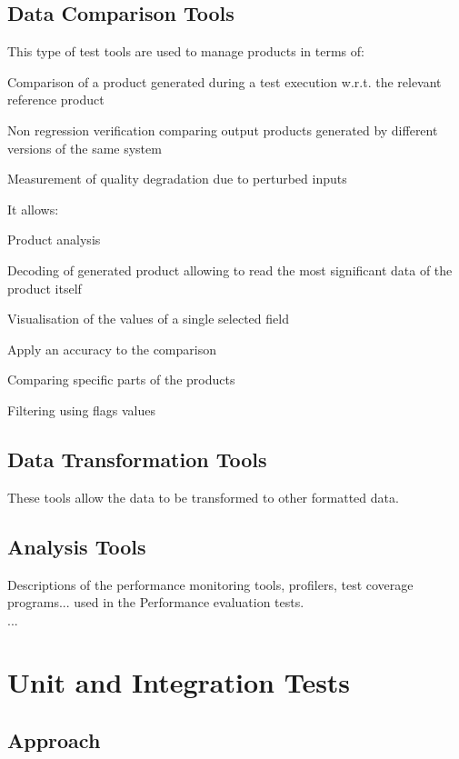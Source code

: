 \subsection{Data Comparison Tools}
This type of test tools are used to manage products in terms of:
\begin{itemize_single}
\item Comparison of a product generated during a test execution w.r.t. the relevant reference product
\item Non regression verification comparing output products generated by different versions of the same system
\item Measurement of quality degradation due to perturbed inputs
\end{itemize_single}
It allows:
\begin{itemize_single}
\item Product analysis
\item Decoding of generated product allowing to read the most significant data of the product itself
\item Visualisation of the values of a single selected field
\item Apply an accuracy to the comparison
\item Comparing specific parts of the products
\item Filtering using flags values
\end{itemize_single}

\subsection{Data Transformation Tools}
These tools allow the data to be transformed to other formatted data.

\subsection{Analysis Tools}
Descriptions of the performance monitoring tools, profilers, test coverage programs... used in the Performance evaluation tests.\\
...

\section{Unit and Integration Tests}

\subsection{Approach}

